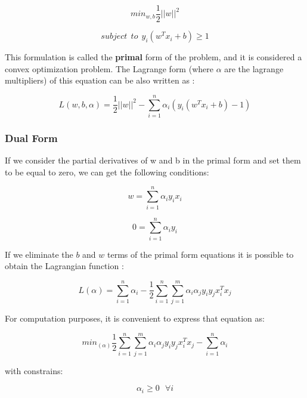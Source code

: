 \documentclass[11pt,twocolumn,letterpaper]{article}
\begin{document}
\begin{equation}
	min_{w,b} \frac{1}{2}||w||^2
\end{equation}

\begin{equation}
	subject \:\:to  \:\: y_i(w^T x_i + b) \geq 1
\end{equation}

This formulation is called the \textbf{primal} form of the problem, and it is considered a convex optimization problem. The Lagrange form (where $\alpha$ are the lagrange multipliers) of this equation can be also written as \cite{Bishop2006}:

\begin{equation}
	L(w,b,\alpha) = \frac{1}{2}||w||^2 - \sum_{i=1}^{n} \alpha_i (y_i(w^T x_i + b) -1) 
\end{equation}

\subsubsection{Dual Form}

If we consider the partial derivatives of w and b in the primal form and set them to be equal to zero, we can get the following conditions:

\begin{equation}
	w = \sum_{i=1}^{n} \alpha_i y_i x_i
\end{equation}

\begin{equation}
	0 = \sum_{i=1}^{n} \alpha_i y_i
\end{equation}

If we eliminate the $b$ and $w$ terms of the primal form equations it is possible to obtain the Lagrangian function \cite{Bishop2006}:

\begin{equation}
	L(\alpha) = \sum_{i=1}^{n} \alpha_i - \frac{1}{2} \sum_{i=1}^{n} \sum_{j=1}^{m} \alpha_i \alpha_j y_i y_j x_i^T x_j
\end{equation}

For computation purposes, it is convenient to express that equation as:

\begin{equation}
	min_{(\alpha)} \frac{1}{2} \sum_{i=1}^{n} \sum_{j=1}^{m} \alpha_i \alpha_j y_i y_j x_i^T x_j - \sum_{i=1}^{n} \alpha_i
\end{equation}

with constrains:

\begin{equation}
	\alpha_i \geq 0  \:\:\: \forall i
\end{equation}
\end{document}
